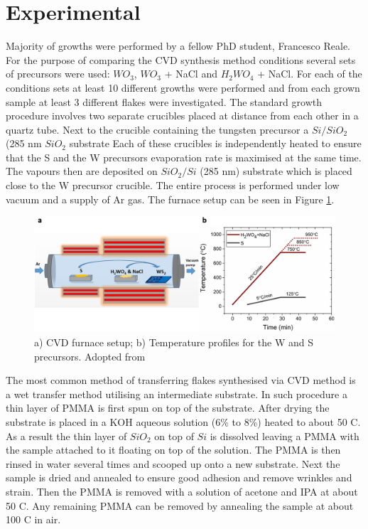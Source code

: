 \section{Experimental}

Majority of growths were performed by a fellow PhD student, Francesco Reale. For the purpose of comparing the CVD synthesis method conditions several sets of precursors were used: $WO_3$, $WO_3$ + NaCl and $H_2WO_4$ + NaCl. For each of the conditions sets at least 10 different growths were performed and from each grown sample at least 3 different flakes were investigated. The standard growth procedure involves two separate crucibles placed at distance from each other in a quartz tube. Next to the crucible containing the tungsten precursor a $Si/SiO_2$ (285 nm $SiO_2$ substrate  Each of these crucibles is independently heated to ensure that the S and the W precursors evaporation rate is maximised at the same time. The vapours then are deposited on $SiO_2/Si$ (285 nm) substrate which is placed close to the W precursor crucible. The entire process is performed under low vacuum and a supply of Ar gas. The furnace setup can be seen in Figure \ref{fig:PaperSIFurnace}.

\begin{figure}[H]
	\begin{center}
		\includegraphics[scale=0.3]{PaperSIFurnace.png}
		\caption{a) CVD furnace setup; b) Temperature profiles for the W and S precursors. Adopted from \cite{Reale2017}}
		\label{fig:PaperSIFurnace}
	\end{center}
\end{figure}
		
The most common method of transferring flakes synthesised via CVD method is a wet transfer method utilising an intermediate substrate. In such procedure a thin layer of PMMA is first spun on top of the substrate. After drying the substrate is placed in a KOH aqueous solution (6\% to 8\%) heated to about 50 {\degree}C. As a result the thin layer of $SiO_2$ on top of $Si$ is dissolved leaving a PMMA with the sample attached to it floating on top of the solution. The PMMA is then rinsed in water several times and scooped up onto a new substrate. Next the sample is dried and annealed to ensure good adhesion and remove wrinkles and strain. Then the PMMA is removed with a solution of acetone and IPA at about 50 {\degree}C. Any remaining PMMA can be removed by annealing the sample at about 100 {\degree}C in air.

